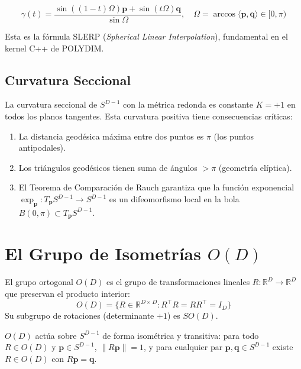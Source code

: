 \begin{equation}
\gamma(t) = \frac{\sin((1-t)\Omega) \mathbf{p} + \sin(t\Omega) \mathbf{q}}{\sin \Omega}, \quad
\Omega = \arccos\langle \mathbf{p}, \mathbf{q} \rangle \in [0, \pi)

\end{equation}

Esta es la fórmula SLERP (\textit{Spherical Linear Interpolation}), fundamental
en el kernel C++ de POLYDIM.

\subsection{Curvatura Seccional}

La curvatura seccional de $S^{D-1}$ con la métrica redonda es constante $K = +1$
en todos los planos tangentes. Esta curvatura positiva tiene consecuencias críticas:

\begin{enumerate}
\item La distancia geodésica máxima entre dos puntos es $\pi$ (los puntos antipodales).
\item Los triángulos geodésicos tienen suma de ángulos $> \pi$ (geometría elíptica).
\item El Teorema de Comparación de Rauch garantiza que la función exponencial
$\exp_{\mathbf{p}}: T_{\mathbf{p}} S^{D-1} \to S^{D-1}$ es un difeomorfismo
local en la bola $B(0, \pi) \subset T_{\mathbf{p}} S^{D-1}$.
\end{enumerate}

\section{El Grupo de Isometrías $O(D)$}

\begin{definition}
El grupo ortogonal $O(D)$ es el grupo de transformaciones lineales $R: \mathbb{R}^D \to \mathbb{R}^D$
que preservan el producto interior:
\begin{equation}
O(D) = \{R \in \mathbb{R}^{D \times D} : R^\top R = R R^\top = I_D\}
\end{equation}
Su subgrupo de rotaciones (determinante $+1$) es $SO(D)$.
\end{definition}

\begin{proposition}
$O(D)$ actúa sobre $S^{D-1}$ de forma isométrica y transitiva: para todo
$R \in O(D)$ y $\mathbf{p} \in S^{D-1}$, $\|{R\mathbf{p}\|} = 1$, y para
cualquier par $\mathbf{p}, \mathbf{q} \in S^{D-1}$ existe $R \in O(D)$ con
$R\mathbf{p} = \mathbf{q}$.
\end{proposition}

